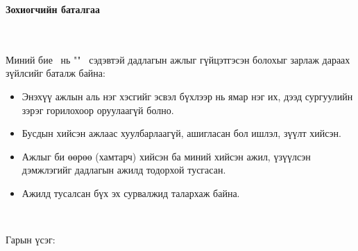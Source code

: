 \makefrontpage
\maketitle

\doublespace

\begin{huge}
\textbf{Зохиогчийн баталгаа}
\end{huge} \\ \ \\ 
\doublespace
Миний бие \@author \ нь "\@title" \ сэдэвтэй дадлагын ажлыг гүйцэтгэсэн болохыг зарлаж дараах зүйлсийг баталж байна:
\begin{itemize}
\item Энэхүү ажлын аль нэг хэсгийг эсвэл бүхлээр нь ямар нэг их, дээд сургуулийн зэрэг горилохоор оруулаагүй болно.
\item Бусдын хийсэн ажлаас хуулбарлаагүй, ашигласан бол ишлэл, зүүлт хийсэн.
\item Ажлыг би өөрөө (хамтарч) хийсэн ба миний хийсэн ажил, үзүүлсэн дэмжлэгийг дадлагын ажилд тодорхой тусгасан. 
\item Ажилд тусалсан бүх эх сурвалжид талархаж байна.  
\end{itemize} 
\ 

Гарын үсэг: \underline{\hspace{5cm}}

